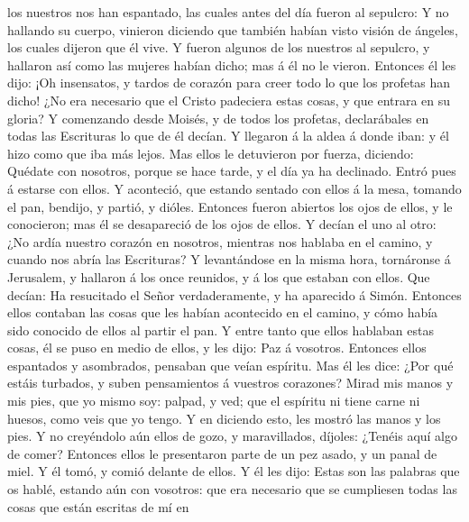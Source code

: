 los nuestros nos han espantado, las cuales antes del día fueron al
sepulcro:  Y no hallando su cuerpo, vinieron diciendo que
también habían visto visión de ángeles, los cuales dijeron que él vive.
 Y fueron algunos de los nuestros al sepulcro, y hallaron
así como las mujeres habían dicho; mas á él no le vieron.
 Entonces él les dijo: ¡Oh insensatos, y tardos de
corazón para creer todo lo que los profetas han dicho! 
¿No era necesario que el Cristo padeciera estas cosas, y que entrara en
su gloria?  Y comenzando desde Moisés, y de todos los
profetas, declarábales en todas las Escrituras lo que de él decían.
 Y llegaron á la aldea á donde iban: y él hizo como que
iba más lejos.  Mas ellos le detuvieron por fuerza,
diciendo: Quédate con nosotros, porque se hace tarde, y el día ya ha
declinado. Entró pues á estarse con ellos.  Y aconteció,
que estando sentado con ellos á la mesa, tomando el pan, bendijo, y
partió, y dióles.  Entonces fueron abiertos los ojos de
ellos, y le conocieron; mas él se desapareció de los ojos de ellos.
 Y decían el uno al otro: ¿No ardía nuestro corazón en
nosotros, mientras nos hablaba en el camino, y cuando nos abría las
Escrituras?  Y levantándose en la misma hora, tornáronse
á Jerusalem, y hallaron á los once reunidos, y á los que estaban con
ellos.  Que decían: Ha resucitado el Señor
verdaderamente, y ha aparecido á Simón.  Entonces ellos
contaban las cosas que les habían acontecido en el camino, y cómo había
sido conocido de ellos al partir el pan.  Y entre tanto
que ellos hablaban estas cosas, él se puso en medio de ellos, y les
dijo: Paz á vosotros.  Entonces ellos espantados y
asombrados, pensaban que veían espíritu.  Mas él les
dice: ¿Por qué estáis turbados, y suben pensamientos á vuestros
corazones?  Mirad mis manos y mis pies, que yo mismo soy:
palpad, y ved; que el espíritu ni tiene carne ni huesos, como veis que
yo tengo.  Y en diciendo esto, les mostró las manos y los
pies.  Y no creyéndolo aún ellos de gozo, y maravillados,
díjoles: ¿Tenéis aquí algo de comer?  Entonces ellos le
presentaron parte de un pez asado, y un panal de miel.  Y
él tomó, y comió delante de ellos.  Y él les dijo: Estas
son las palabras que os hablé, estando aún con vosotros: que era
necesario que se cumpliesen todas las cosas que están escritas de mí en

